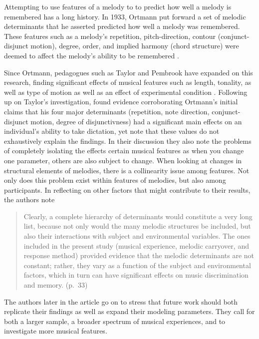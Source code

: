 \documentclass[]{book}
\begin{document}
Attempting to use features of a melody to to predict how well a melody is remembered has a long history.
In 1933, Ortmann put forward a set of melodic determinants that he asserted predicted how well a melody was remembered.
These features such as a melody's repetition, pitch-direction, contour (conjunct-disjunct motion), degree, order, and implied harmony (chord structure) were deemed to affect the melody's ability to be remembered \citep{ortmannTonalDeterminantsMelodic1933}.

Since Ortmann, pedagogues such as Taylor and Pembrook have expanded on this research, finding significant effects of musical features such as length, tonality, as well as type of motion as well as an effect of experimental condition \citep{taylorStrategiesMemoryShort1983}.
Following up on Taylor's investigation, \citet{taylorStrategiesMemoryShort1983} found evidence corroborating Ortmann's initial claims that his four major determinants (repetition, note direction, conjunct-disjunct motion, degree of disjunctivness) had a significant main effects on an individual's ability to take dictation, yet note that these values do not exhaustively explain the findings.
In their discussion they also note the problems of completely isolating the effects certain musical features as when you change one parameter, others are also subject to change.
When looking at changes in structural elements of melodies, there is a collinearity issue among features.
Not only does this problem exist within features of melodies, but also among participants.
In reflecting on other factors that might contribute to their results, the authors note

\begin{quote}
Clearly, a complete hierarchy of determinants would constitute a very long
list, because not only would the many melodic structures be included, but also
their interactions with subject and environmental variables. The ones included
in the present study (musical experience, melodic carryover, and response
method) provided evidence that the melodic determinants are not constant;
rather, they vary as a function of the subject and environmental factors, which
in turn can have significant effects on music discrimination and memory. (p.~33)
\end{quote}

The authors later in the article go on to stress that future work should both replicate their findings as well as expand their modeling parameters.
They call for both a larger sample, a broader spectrum of musical experiences, and to investigate more musical features.
\end{document}
